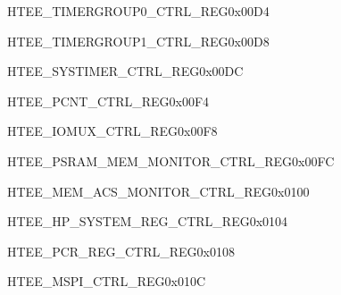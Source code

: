 \begin{register}{H}{TEE\_TIMERGROUP0\_CTRL\_REG}{0x00D4}\label{regdesc:TEETIMERGROUP0CTRLREG}
\end{register}\vspace{-3em}

\begin{register}{H}{TEE\_TIMERGROUP1\_CTRL\_REG}{0x00D8}\label{regdesc:TEETIMERGROUP1CTRLREG}
\end{register}\vspace{-3em}

\begin{register}{H}{TEE\_SYSTIMER\_CTRL\_REG}{0x00DC}\label{regdesc:TEESYSTIMERCTRLREG}
\end{register}\vspace{-3em}



\begin{register}{H}{TEE\_PCNT\_CTRL\_REG}{0x00F4}\label{regdesc:TEEPCNTCTRLREG}
\end{register}\vspace{-3em}

\begin{register}{H}{TEE\_IOMUX\_CTRL\_REG}{0x00F8}\label{regdesc:TEEIOMUXCTRLREG}
\end{register}\vspace{-3em}

\begin{register}{H}{TEE\_PSRAM\_MEM\_MONITOR\_CTRL\_REG}{0x00FC}\label{regdesc:TEEPSRAMMEMMONITORCTRLREG}
\end{register}\vspace{-3em}

\begin{register}{H}{TEE\_MEM\_ACS\_MONITOR\_CTRL\_REG}{0x0100}\label{regdesc:TEEMEMACSMONITORCTRLREG}
\end{register}\vspace{-3em}

\begin{register}{H}{TEE\_HP\_SYSTEM\_REG\_CTRL\_REG}{0x0104}\label{regdesc:TEEHPSYSTEMREGCTRLREG}
\end{register}\vspace{-3em}

\begin{register}{H}{TEE\_PCR\_REG\_CTRL\_REG}{0x0108}\label{regdesc:TEEPCRREGCTRLREG}
\end{register}\vspace{-3em}

\begin{register}{H}{TEE\_MSPI\_CTRL\_REG}{0x010C}\label{regdesc:TEEMSPICTRLREG}
\end{register}\vspace{-3em}

